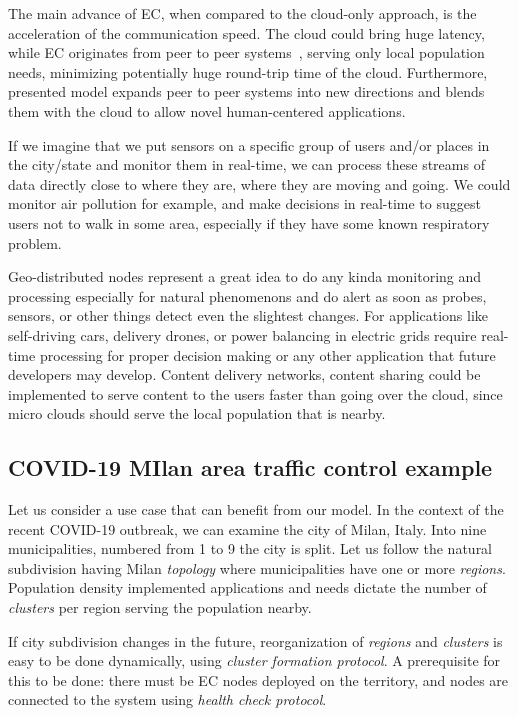 The main advance of EC, when compared to the cloud-only approach, is the acceleration of the communication speed. The cloud could bring huge latency, while EC originates from peer to peer systems~\cite{LopezMEDHIBFR15}, serving only local population needs, minimizing potentially huge round-trip time of the cloud. Furthermore, presented model expands peer to peer systems into new directions and blends them with the cloud to allow novel human-centered applications. 

If we imagine that we put sensors on a specific group of users and/or places in the city/state and monitor them in real-time, we can process these streams of data directly close to where they are, where they are moving and going. We could monitor air pollution for example, and make decisions in real-time to suggest users not to walk in some area, especially if they have some known respiratory problem.

Geo-distributed nodes represent a great idea to do any kinda monitoring and processing especially for natural phenomenons and do alert as soon as probes, sensors, or other things detect even the slightest changes. For applications like self-driving cars, delivery drones, or power balancing in electric grids require real-time processing for proper decision making or any other application that future developers may develop. Content delivery networks, content sharing could be implemented to serve content to the users faster than going over the cloud, since micro clouds should serve the local population that is nearby.

\subsection{COVID-19 MIlan area traffic control example}\label{sec:covid_example}
Let us consider a use case that can benefit from our model. In the context of the recent COVID-19 outbreak, we can examine the city of Milan, Italy. Into nine municipalities, numbered from 1 to 9 the city is split. Let us follow the natural subdivision having Milan \emph{topology} where municipalities have one or more \emph{regions}. Population density implemented applications and needs dictate the number of \emph{clusters} per region serving the population nearby. 

If city subdivision changes in the future, reorganization of \emph{regions} and \emph{clusters} is easy to be done dynamically, using \emph{cluster formation protocol}. A prerequisite for this to be done: there must be EC nodes deployed on the territory, and nodes are connected to the system using \emph{health check protocol}.

